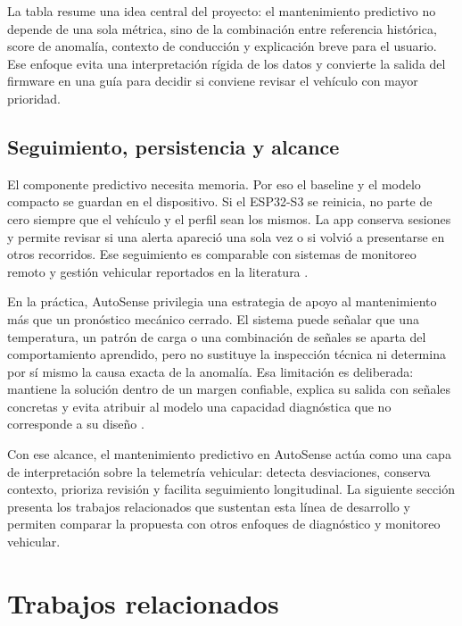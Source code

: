 \documentclass[12pt,letterpaper]{report}
\begin{document}
La tabla resume una idea central del proyecto: el mantenimiento predictivo no depende de una sola métrica, sino de la combinación entre referencia histórica, score de anomalía, contexto de conducción y explicación breve para el usuario. Ese enfoque evita una interpretación rígida de los datos y convierte la salida del firmware en una guía para decidir si conviene revisar el vehículo con mayor prioridad.

\subsection{Seguimiento, persistencia y alcance}

El componente predictivo necesita memoria. Por eso el baseline y el modelo compacto se guardan en el dispositivo. Si el ESP32-S3 se reinicia, no parte de cero siempre que el vehículo y el perfil sean los mismos. La app conserva sesiones y permite revisar si una alerta apareció una sola vez o si volvió a presentarse en otros recorridos. Ese seguimiento es comparable con sistemas de monitoreo remoto y gestión vehicular reportados en la literatura \cite{shafi2018_vehicle_remote_health,camposferreira2023_vehicle_driver_monitoring,dabarera2022_iot_vehicle_management}.

En la práctica, AutoSense privilegia una estrategia de apoyo al mantenimiento más que un pronóstico mecánico cerrado. El sistema puede señalar que una temperatura, un patrón de carga o una combinación de señales se aparta del comportamiento aprendido, pero no sustituye la inspección técnica ni determina por sí mismo la causa exacta de la anomalía. Esa limitación es deliberada: mantiene la solución dentro de un margen confiable, explica su salida con señales concretas y evita atribuir al modelo una capacidad diagnóstica que no corresponde a su diseño \cite{mahale2025_review_predictive_maintenance,michailidis2025_obdii_review}.

Con ese alcance, el mantenimiento predictivo en AutoSense actúa como una capa de interpretación sobre la telemetría vehicular: detecta desviaciones, conserva contexto, prioriza revisión y facilita seguimiento longitudinal. La siguiente sección presenta los trabajos relacionados que sustentan esta línea de desarrollo y permiten comparar la propuesta con otros enfoques de diagnóstico y monitoreo vehicular.

\section{Trabajos relacionados}
\end{document}

